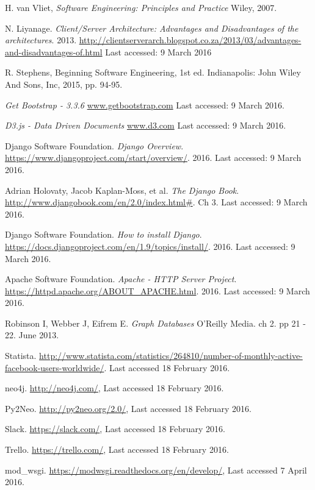 \documentclass[12pt,onecolumn]{article}
\begin{document}
\begin{thebibliography}{1}
	 H. van Vliet, \emph{Software Engineering: Principles and Practice} Wiley, 2007.
	
	 N. Liyanage. \emph{Client/Server Architecture: Advantages and Disadvantages of the architectures}. 2013. \url{http://clientserverarch.blogspot.co.za/2013/03/advantages-and-disadvantages-of.html} Last accessed: 9 March 2016
	
	 R. Stephens, Beginning Software Engineering, 1st ed. Indianapolis: John Wiley And Sons, Inc, 2015, pp. 94-95.
	
	  \emph{Get Bootstrap - 3.3.6} \url{www.getbootstrap.com} Last accessed: 9 March 2016.
	
	  \emph{D3.js - Data Driven Documents} \url{www.d3.com} Last accessed: 9 March 2016.
	
	 Django Software Foundation. \emph{Django Overview}. \url{https://www.djangoproject.com/start/overview/}. 2016. Last accessed: 9 March 2016. 
	
	 Adrian Holovaty, Jacob Kaplan-Moss, et al. \emph{The Django Book}. \url{http://www.djangobook.com/en/2.0/index.html#}. Ch 3. Last accessed: 9 March 2016.
	
	 Django Software Foundation. \emph{How to install Django}. \url{https://docs.djangoproject.com/en/1.9/topics/install/}. 2016. Last accessed: 9 March 2016.	
	
	 Apache Software Foundation. \emph{Apache - HTTP Server Project}. \url{https://httpd.apache.org/ABOUT_APACHE.html}. 2016. Last accessed: 9 March 2016.	
	
	 Robinson I, Webber J, Eifrem E. \emph{Graph Databases} O'Reilly Media. ch 2. pp 21 - 22. June 2013.

	 Statista. \url {http://www.statista.com/statistics/264810/number-of-monthly-active-facebook-users-worldwide/}. Last accessed 18 February 2016. 

	 neo4j. \url{http://neo4j.com/}, Last accessed 18 February 2016.

	 Py2Neo. \url{http://py2neo.org/2.0/}, Last accessed 18 February 2016.

	 Slack. \url{https://slack.com/}, Last accessed 18 February 2016.

	 Trello. \url{https://trello.com/}, Last accessed 18 February 2016.

	 mod\_wsgi. \url{https://modwsgi.readthedocs.org/en/develop/}, Last accessed 7 April 2016.


\end{thebibliography}
\end{document}
